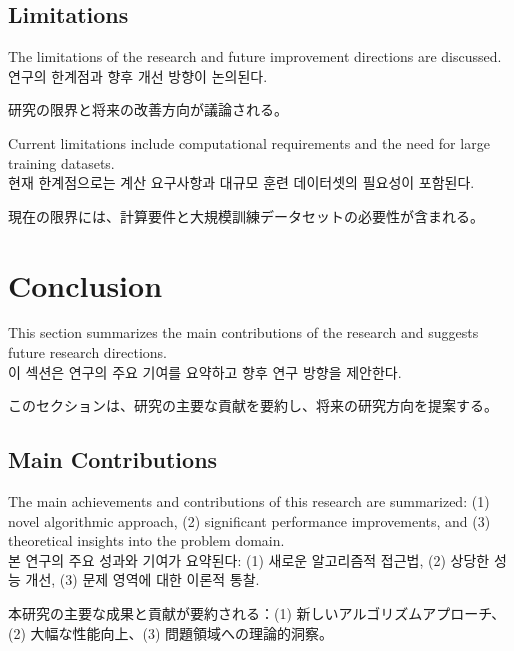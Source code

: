 \documentclass[preprint,12pt]{elsarticle}
\begin{document}
\subsection{Limitations}
The limitations of the research and future improvement directions are discussed. \\
연구의 한계점과 향후 개선 방향이 논의된다. \\
\begin{CJK}{UTF8}{min}
研究の限界と将来の改善方向が議論される。
\end{CJK}

Current limitations include computational requirements and the need for large training datasets. \\
현재 한계점으로는 계산 요구사항과 대규모 훈련 데이터셋의 필요성이 포함된다. \\
\begin{CJK}{UTF8}{min}
現在の限界には、計算要件と大規模訓練データセットの必要性が含まれる。
\end{CJK}

\section{Conclusion}
\label{sec:conclusion}

This section summarizes the main contributions of the research and suggests future research directions. \\
이 섹션은 연구의 주요 기여를 요약하고 향후 연구 방향을 제안한다. \\
\begin{CJK}{UTF8}{min}
このセクションは、研究の主要な貢献を要約し、将来の研究方向を提案する。
\end{CJK}

\subsection{Main Contributions}
The main achievements and contributions of this research are summarized: (1) novel algorithmic approach, (2) significant performance improvements, and (3) theoretical insights into the problem domain. \\
본 연구의 주요 성과와 기여가 요약된다: (1) 새로운 알고리즘적 접근법, (2) 상당한 성능 개선, (3) 문제 영역에 대한 이론적 통찰. \\
\begin{CJK}{UTF8}{min}
本研究の主要な成果と貢献が要約される：(1) 新しいアルゴリズムアプローチ、(2) 大幅な性能向上、(3) 問題領域への理論的洞察。
\end{CJK}
\end{document}
